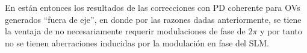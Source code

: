 
En \cite{EcheverriChacon2015} están entonces los resultados de las correcciones con PD coherente para OVs generados ``fuera de eje'', en donde por las razones dadas anteriormente, se tiene la ventaja de no necesariamente requerir modulaciones de fase de $2\pi$ y por tanto no se tienen aberraciones inducidas por la modulación en fase del SLM.\\ %


